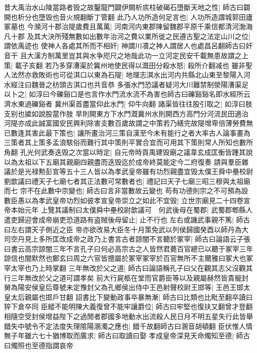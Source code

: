 昔大禹治水山陵當路者毁之故鑿龍門闢伊闕析㡳柱破碣石墮斷天地之性|{
	師古曰闢開也析分也墮毁也音火規翻斷丁管翻}
此乃人功所造何足言也|{
	人功所造謂城郭田廬冢墓也}
今瀕河十郡治隄歲費且萬萬|{
	河南河内東郡陳留魏郡平原千乘信都清河渤海凡十郡}
及其大決所殘無數如出數年治河之費以業所徙之民遵古聖之法定山川之位|{
	謂依禹迹也}
使神人各處其所而不相奸|{
	神謂川凟之神人謂居人也處昌呂翻師古曰奸音干}
且大漢方制萬里豈其與水争咫尺之地哉此功一立河定民安千載無患故謂之上策|{
	載子亥翻}
若乃多穿漕渠於冀州地使民得以溉田分殺水怒|{
	殺所介翻减也}
雖非聖人法然亦救敗術也可從淇口以東為石隄|{
	地理志淇水出河内共縣北山東至黎陽入河水經注曰魏晉之枋頭古淇口也共音恭}
多張水門恐議者疑河大川難禁制滎陽漕渠足以卜之|{
	如淳曰今礫谿口是也言作水門流水流不為害也師古曰礫谿谿名即水經所云濟水東過礫谿者}
冀州渠首盡當仰此水門|{
	仰牛向翻}
諸渠皆往往股引取之|{
	如淳曰肢支别也㨿如說股當作肢}
旱則開東方下水門溉冀州水則開西方高門分河流民田適治河隄亦成此誠富國安民興利除害支數百歲故謂之中策若乃繕完故隄增卑倍薄勞費無已數逢其害此最下策也|{
	讓所畫治河三策自漢至今未有能行之者大率古人論事畫為三策者其上策多孟浪駭俗而難行其中策則平實合宜而可用其下策則常人所知也數所角翻}
孔光何武奏迭毁之次當以時定|{
	自元帝時貢禹建毁廟之議韋玄成匡衡皆踵其說以為太祖以下五廟其親廟四親盡而迭毁迄於成帝終莫能定今二府復奏}
請與羣臣雜議於是光禄勲彭宣等五十三人皆以為孝武皇帝雖有功烈親盡宜毁太僕王舜中壘校尉劉歆議曰禮天子七廟七者其正法數可常數者也|{
	禮記曰天子七廟三昭三穆與太祖廟而七}
宗不在此數中宗變也|{
	師古曰言非當數故云變也}
苟有功德則宗之不可預為設數臣愚以為孝武皇帝功烈如彼孝宣皇帝崇立之如此不宜毁|{
	立世宗廟見二十四卷宣帝本始元年}
上覽其議制曰太僕舜中壘校尉歆議可　何武後母在蜀郡|{
	武蜀郡郫縣人}
遣吏歸迎會成帝崩吏恐道路有盗賊後母留止|{
	止不行也}
左右或譏武事親不篤|{
	師古曰左右謂天子側近之臣}
帝亦欲改易大臣冬十月策免武以列侯歸國癸酉以師丹為大司空丹見上多所匡改成帝之政乃上書言古者諒闇不言聽於冢宰|{
	師古曰論語云子張曰書云高宗諒闇三年不言孔子曰何必高宗古之人皆然君薨百官總已以聽于冢宰三年諒信也闇默然也鄭玄曰周之六官皆摠屬於冢宰冢宰於百官無所不主爾雅曰冢大也冢宰太宰也乃上時掌翻}
三年無改於父之道|{
	師古曰論語稱孔子曰父在觀其志父沒觀其行三年無改於父之道可謂孝矣}
前大行屍柩在堂而官爵臣等以及親屬赫然皆貴寵封舅為陽安侯皇后尊號未定豫封父為孔鄉侯出侍中王邑射聲校尉王邯等|{
	王邑王邯太皇太后親屬也邯戶甘翻}
詔書比下變動政事卒暴無漸|{
	師古曰比類也比毗至翻卒讀曰猝下倉卒同}
臣縱不能明陳大義復曾不能牢讓爵位|{
	師古曰牢堅也復扶又翻曾才登翻}
相隨空受封侯增益陛下之過閒者郡國多地動水出流殺人民日月不明五星失行此皆舉錯失中號令不定法度失理隂陽溷濁之應也|{
	錯千故翻師古曰溷音胡頓翻}
臣伏惟人情無子年雖六七十猶博取而廣求|{
	師古曰取讀曰娶}
孝成皇帝深見天命燭知至德|{
	師古曰燭照也至德指謂哀帝}
